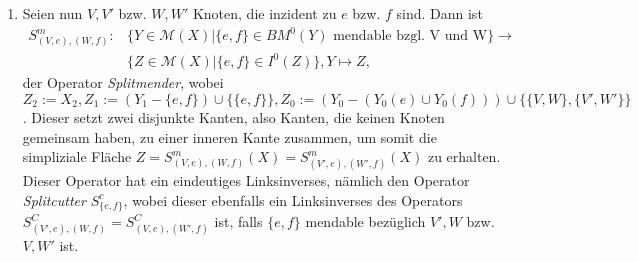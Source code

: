 \documentclass[12pt,titlepage]{article}
\begin{document}
\begin{enumerate}
  \item Seien nun $V,V'$ bzw. $W,W'$ Knoten, die inzident zu $e$ bzw. $f$ sind. Dann ist 
  \begin{align*}
  S^m_{(V,e),(W,f)}:&\{Y \in \mathcal{M}(X)|\{e,f\} \in BM^{0}(Y) \text{ mendable bzgl. V und W} \}  
  \to\\ & \{Z \in \mathcal{M}(X)|\{e,f\} \in I^{0}(Z)\}, 
  Y \mapsto Z, 
   \end{align*}
  der Operator \emph{Splitmender}, wobei $Z_2 := X_2,Z_1 := (Y_1 - \{e,f\}) \cup \{\{e,f\}\},Z_0:=(Y_0 -(Y_0 (e) \cup Y_0(f))) \cup \{\{V,W\},\{V',W'\}\}$. Dieser setzt zwei disjunkte Kanten, also Kanten, die keinen Knoten gemeinsam haben, zu einer inneren Kante zusammen, um somit die simpliziale Fläche $Z=S^m_{(V,e),(W,f)}(X)=S^m_{(V',e),(W',f)}(X)$ zu erhalten. Dieser Operator hat ein eindeutiges Linksinverses, nämlich den Operator \emph{Splitcutter} $S^c_{\{e,f\}}$, wobei dieser ebenfalls ein Linksinverses des Operators  $S^C_{(V',e),(W,f)}=S^C_{(V,e),(W',f)}$ ist, falls $\{e,f\}$ mendable bezüglich $V',W$ bzw. $V,W'$ ist.\\
\begin{comment}  
\definecolor{ffffff}{rgb}{1.,1.,1.}
\definecolor{ududff}{rgb}{0.30196078431372547,0.30196078431372547,1.}
\definecolor{ffffqq}{rgb}{1.,1.,0.}
\begin{tikzpicture}[line cap=round,line join=round,>=triangle 45,x=1.3cm,y=1.3cm]


\end{comment}
\end{enumerate}
\end{document}
